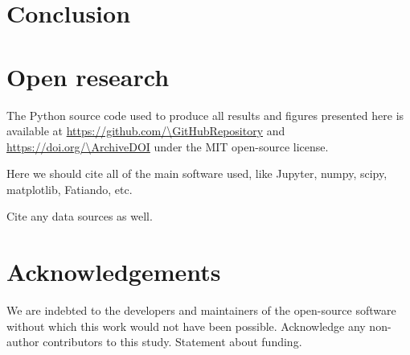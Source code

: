 \section{Conclusion}

\lipsum[1]


\section{Open research}

The Python source code used to produce all results and figures presented here
is available at \url{https://github.com/\GitHubRepository} and
\url{https://doi.org/\ArchiveDOI} under the MIT open-source license.

Here we should cite all of the main software used, like Jupyter, numpy, scipy,
matplotlib, Fatiando, etc.

Cite any data sources as well.

\section{Acknowledgements}

We are indebted to the developers and maintainers of the open-source software
without which this work would not have been possible.
Acknowledge any non-author contributors to this study.
Statement about funding.

